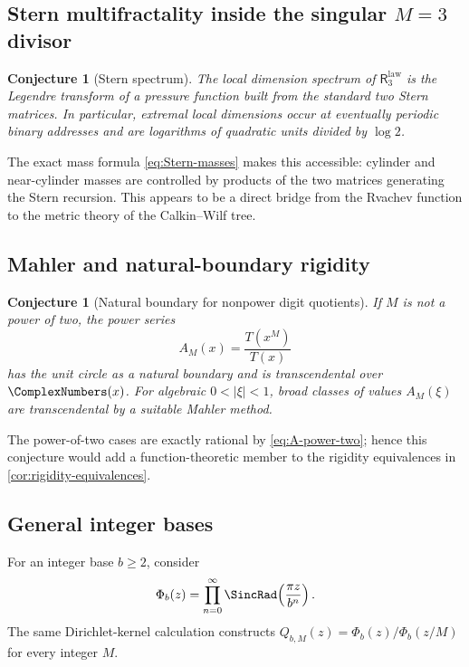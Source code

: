 \documentclass[11pt,oneside]{article}
\newtheorem{conjecture}[theorem]{Conjecture}
\theoremstyle{definition}
\theoremstyle{remark}
\newcommand{\ReciprocalIntegerLaw}[1]{\mathsf R^{\mathrm{law}}_{#1}}
\begin{document}
\subsection{Stern multifractality inside the singular $M=3$ divisor}

\begin{conjecture}[Stern spectrum]
\label{conj:Stern-spectrum}
The local dimension spectrum of $\ReciprocalIntegerLaw{3}$ is the Legendre transform of a pressure function
built from the standard two Stern matrices.  In particular, extremal local dimensions occur
at eventually periodic binary addresses and are logarithms of quadratic units divided by
$\log2$.
\end{conjecture}

The exact mass formula \eqref{eq:Stern-masses} makes this accessible: cylinder and
near-cylinder masses are controlled by products of the two matrices generating the Stern
recursion.  This appears to be a direct bridge from the Rvachev function to the metric theory
of the Calkin--Wilf tree.

\subsection{Mahler and natural-boundary rigidity}

\begin{conjecture}[Natural boundary for nonpower digit quotients]
\label{conj:natural-boundary}
If $M$ is not a power of two, the power series
\begin{equation}
 A_M(x)=\frac{T(x^M)}{T(x)}
 \label{eq:AM-quotient-conj}
\end{equation}
has the unit circle as a natural boundary and is transcendental over $\ComplexNumbers(x)$.  For
algebraic $0<|\xi|<1$, broad classes of values $A_M(\xi)$ are transcendental by a suitable
Mahler method.
\end{conjecture}

The power-of-two cases are exactly rational by \eqref{eq:A-power-two}; hence this conjecture
would add a function-theoretic member to the rigidity equivalences in
\cref{cor:rigidity-equivalences}.

\subsection{General integer bases}

For an integer base $b\ge2$, consider
\begin{equation}
 \Phi_b(z)=\prod_{n=0}^{\infty}\SincRad\!\left(\frac{\pi z}{b^n}\right).
 \label{eq:Phi-b}
\end{equation}
The same Dirichlet-kernel calculation constructs
$Q_{b,M}(z)=\Phi_b(z)/\Phi_b(z/M)$ for every integer $M$.
\end{document}
